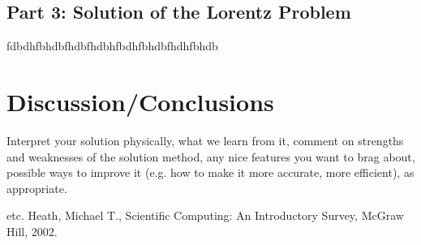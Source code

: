 \documentclass[11pt]{article}
\begin{document}
\subsection{Part 3: Solution of the Lorentz Problem}
%
fdbdhfbhdbfhdbfhdbhfbdhfbhdbfhdhfbhdb

\section{Discussion/Conclusions}\label{S:5}
Interpret your solution physically, what we learn from it, comment on strengths and
weaknesses of the solution method, any nice features you want to brag about, 
possible ways to improve it (e.g. how to make it more accurate, more efficient), as
appropriate.
\begin{thebibliography}{100}
etc. 
Heath, Michael T., Scientific Computing: An Introductory Survey, McGraw Hill, 2002.
%
%
\end{thebibliography}
\newpage
\appendix 
\setcounter{section}{0}           
\end{document}
